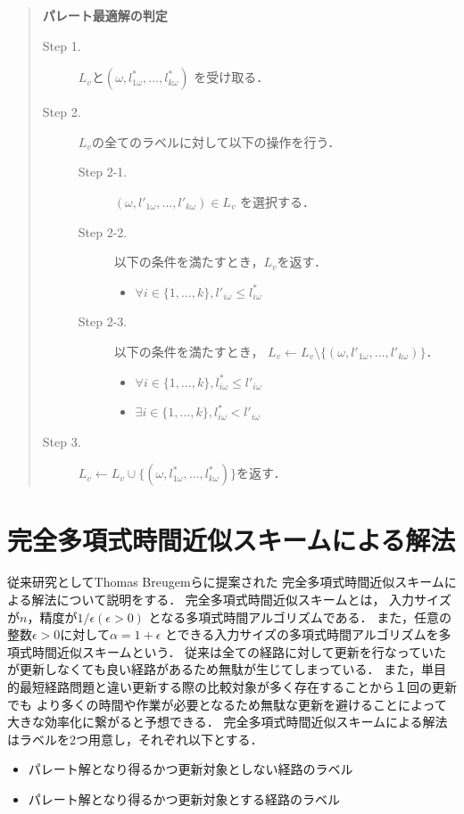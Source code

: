\documentclass[12pt]{optlab-bachelor}
\begin{document}
\begin{quote}
  \textbf{パレート最適解の判定}
  \begin{description}
    \item[Step 1.] $L_v$と$(\omega,l^*_{1\omega},\ldots,l^*_{k\omega})$
    を受け取る．
    \item[Step 2.] $L_v$の全てのラベルに対して以下の操作を行う．
    \begin{description}
    \item[Step 2-1.] $(\omega,l'_{1\omega},\ldots,l'_{k\omega}) \in L_v$
    を選択する．
    \item[Step 2-2.] 以下の条件を満たすとき，$L_v$を返す．
    \begin{itemize}
      \item $\forall i \in \{1,\ldots,k\},l'_{i\omega} \le l^*_{i\omega}$
    \end{itemize}
    \item[Step 2-3.] 以下の条件を満たすとき，
    $L_v \leftarrow L_v \setminus \{(\omega,l'_{1\omega},\ldots,l'_{k\omega})\}$．
    \begin{itemize}
      \item $\forall i \in \{1,\ldots,k\},l^*_{i\omega} \le l'_{i\omega}$
      \item $\exists i \in \{1,\ldots,k\},l^*_{i\omega} < l'_{i\omega}$
    \end{itemize}
    \end{description}
    \item[Step 3.]
    $L_v \leftarrow L_v \cup \{(\omega,l^*_{1\omega},\ldots,l^*_{k\omega})\}$を返す．
  \end{description}
\end{quote}

\section{完全多項式時間近似スキームによる解法}
従来研究としてThomas Breugemら\cite{Breugem}に提案された
完全多項式時間近似スキームによる解法について説明をする．
完全多項式時間近似スキームとは，
入力サイズが$n$，精度が$1 / \epsilon(\epsilon > 0)$
となる多項式時間アルゴリズムである．
また，任意の整数$\epsilon > 0$に対して$\alpha = 1+\epsilon$
とできる入力サイズの多項式時間アルゴリズムを多項式時間近似スキームという．
従来は全ての経路に対して更新を行なっていたが更新しなくても良い経路があるため無駄が生じてしまっている．
また，単目的最短経路問題と違い更新する際の比較対象が多く存在することから１回の更新でも
より多くの時間や作業が必要となるため無駄な更新を避けることによって大きな効率化に繋がると予想できる．
完全多項式時間近似スキームによる解法はラベルを2つ用意し，それぞれ以下とする．
\begin{itemize}
\item パレート解となり得るかつ更新対象としない経路のラベル
\item パレート解となり得るかつ更新対象とする経路のラベル
\end{itemize}
\end{document}
